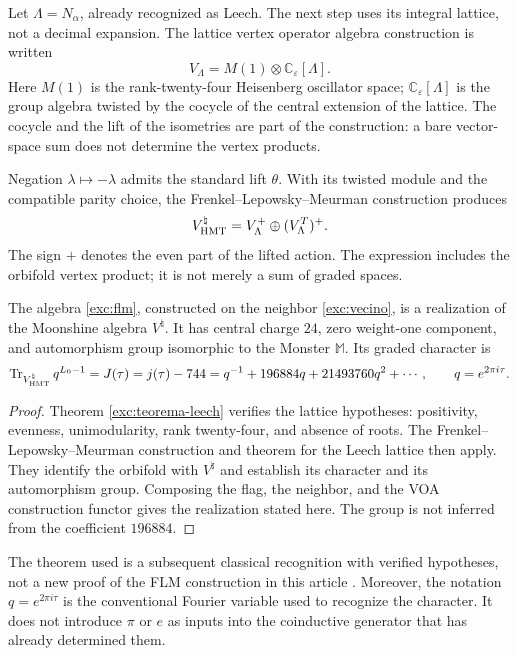 Let $\Lambda=N_\alpha$, already recognized as Leech. The next step
uses its integral lattice, not a decimal expansion. The lattice
vertex operator algebra construction is written
\[
 V_\Lambda=M(1)\otimes\mathbb C_\varepsilon[\Lambda].
\]
Here $M(1)$ is the rank-twenty-four Heisenberg oscillator
space; $\mathbb C_\varepsilon[\Lambda]$ is the group algebra
twisted by the cocycle of the central extension of the lattice. The
cocycle and the lift of the isometries are part of the
construction: a bare vector-space sum does not determine the vertex
products.

Negation $\lambda\mapsto-\lambda$ admits the standard lift
$\theta$. With its twisted module and the compatible parity choice,
the Frenkel--Lepowsky--Meurman construction produces
\begin{equation}
 V^\natural_{\rm HMT}
   =V_\Lambda^+\oplus(V_\Lambda^T)^+.
 \label{exc:flm}
\end{equation}
The sign $+$ denotes the even part of the lifted action. The expression
includes the orbifold vertex product; it is not merely a sum
of graded spaces.

\begin{theorem}
\label{exc:moonshine}
The algebra \eqref{exc:flm}, constructed on the neighbor
\eqref{exc:vecino}, is a realization of the Moonshine algebra
$V^\natural$. It has central charge $24$, zero weight-one component,
and automorphism group isomorphic to the Monster $\mathbb M$. Its graded
character is
\begin{equation}
 \operatorname{Tr}_{V^\natural_{\rm HMT}}q^{L_0-1}
   =J(\tau)=j(\tau)-744
   =q^{-1}+196884q+21493760q^2+\cdots,
 \qquad q=e^{2\pi i\tau}.
 \label{exc:j}
\end{equation}
\end{theorem}

\begin{proof}
Theorem \ref{exc:teorema-leech} verifies the lattice hypotheses:
positivity, evenness, unimodularity, rank twenty-four, and absence of
roots. The Frenkel--Lepowsky--Meurman construction and theorem
for the Leech lattice then apply. They identify
the orbifold with $V^\natural$ and establish its character and its
automorphism group. Composing the flag, the neighbor, and the VOA
construction functor gives the realization stated here. The group is not inferred
from the coefficient $196884$.
\end{proof}

The theorem used is a subsequent classical recognition with verified
hypotheses, not a new proof of the FLM construction in this article
\cite{flm}.
Moreover, the notation $q=e^{2\pi i\tau}$ is the conventional Fourier
variable used to recognize the character. It does not introduce $\pi$
or $e$ as inputs into the coinductive generator that has already determined them.


